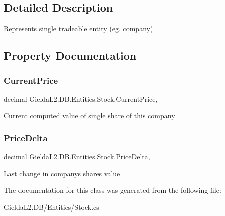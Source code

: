 \subsection{Detailed Description}
Represents single tradeable entity (eg. company) 



\subsection{Property Documentation}
\mbox{\label{class_gielda_l2_1_1_d_b_1_1_entities_1_1_stock_a6f7d6e47c44e70138e95c1aa21bde708}} 
\subsubsection{\texorpdfstring{CurrentPrice}{CurrentPrice}}
{\footnotesize\ttfamily decimal Gielda\+L2.\+D\+B.\+Entities.\+Stock.\+Current\+Price\hspace{0.3cm}{\ttfamily [get]}, {\ttfamily [set]}}



Current computed value of single share of this company 

\mbox{\label{class_gielda_l2_1_1_d_b_1_1_entities_1_1_stock_a81e7483e621a4c6baada66f707ab0c71}} 
\subsubsection{\texorpdfstring{PriceDelta}{PriceDelta}}
{\footnotesize\ttfamily decimal Gielda\+L2.\+D\+B.\+Entities.\+Stock.\+Price\+Delta\hspace{0.3cm}{\ttfamily [get]}, {\ttfamily [set]}}



Last change in company\textquotesingle{}s shares value 



The documentation for this class was generated from the following file\+:\begin{DoxyCompactItemize}
\item 
Gielda\+L2.\+D\+B/\+Entities/Stock.\+cs\end{DoxyCompactItemize}
